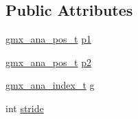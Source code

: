 \subsection*{\-Public \-Attributes}
\begin{DoxyCompactItemize}
\item 
\hyperlink{structgmx__ana__pos__t}{gmx\-\_\-ana\-\_\-pos\-\_\-t} \hyperlink{structt__methoddata__merge_af2fb8c8bb669699c46f1e328426b503b}{p1}
\item 
\hyperlink{structgmx__ana__pos__t}{gmx\-\_\-ana\-\_\-pos\-\_\-t} \hyperlink{structt__methoddata__merge_a67767a5c4384ec3d24bcf71b5b498ff4}{p2}
\item 
\hyperlink{structgmx__ana__index__t}{gmx\-\_\-ana\-\_\-index\-\_\-t} \hyperlink{structt__methoddata__merge_a379ce4c2c23b37ea15c5326ece594c51}{g}
\item 
int \hyperlink{structt__methoddata__merge_a2b8131ae7283a0dea25cf3372c5d743b}{stride}
\end{DoxyCompactItemize}



